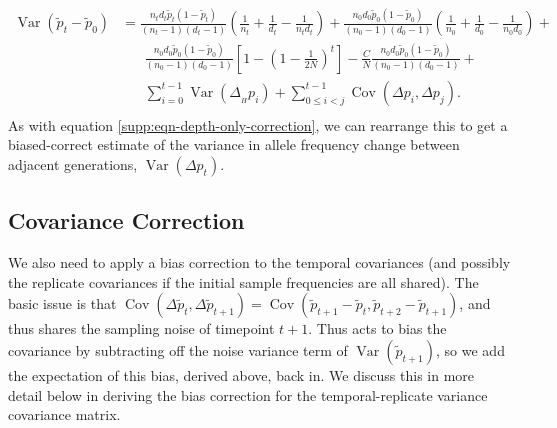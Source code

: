 \documentclass[11pt]{article}
\DeclareMathOperator{\var}{Var}
\DeclareMathOperator{\cov}{Cov}
\begin{document}
\begin{align}
  \var(\widetilde{p}_t - \widetilde{p}_0) &= 
  \frac{n_t d_t \widetilde{p}_t(1-\widetilde{p}_t)}{(n_t-1)(d_t-1)} \left(\frac{1}{n_t} + \frac{1}{d_t} - \frac{1}{n_t d_t} \right) + 
 \frac{n_0 d_0 \widetilde{p}_0(1-\widetilde{p}_0)}{(n_0-1)(d_0-1)} \left( \frac{1}{n_0} + \frac{1}{d_0} - \frac{1}{n_0 d_0}\right) + \\ & \nonumber\;\;\;\;\;\;
 \frac{n_0 d_0 \widetilde{p}_0(1-\widetilde{p}_0)}{(n_0-1)(d_0-1)}   \left[1 - \left(1-\frac{1}{2N}\right)^t \right]  - \frac{C}{N}  \frac{n_0 d_0 \widetilde{p}_0(1-\widetilde{p}_0)}{(n_0-1)(d_0-1)} + \\ \nonumber & \;\;\;\;\;\; \sum_{i=0}^{t-1} \var(\Delta_{_H} p_i)  + \sum_{0 \le i < j}^{t-1} \cov(\Delta p_i, \Delta p_j).  \\
\end{align}
%
As with equation \eqref{supp:eqn-depth-only-correction}, we can rearrange this
to get a biased-correct estimate of the variance in allele frequency change
between adjacent generations, $\var(\Delta p_t)$. 


\subsection{Covariance Correction}
\label{supp:cov-corr}

We also need to apply a bias correction to the temporal covariances (and
possibly the replicate covariances if the initial sample frequencies are all
shared). The basic issue is that $\cov(\Delta \widetilde{p}_t, \Delta
\widetilde{p}_{t+1}) = \cov(\widetilde{p}_{t+1} - \widetilde{p}_t,
\widetilde{p}_{t+2} - \widetilde{p}_{t+1})$, and thus shares the sampling noise
of timepoint $t+1$. Thus acts to bias the covariance by subtracting off the
noise variance term of $\var(\widetilde{p}_{t+1})$, so we add the expectation
of this bias, derived above, back in. We discuss this in more detail below in
deriving the bias correction for the temporal-replicate variance covariance
matrix.
\end{document}
